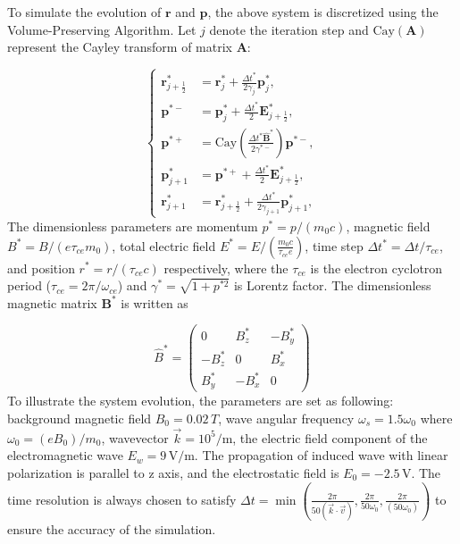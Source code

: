 \documentclass{cpbtex3}
\begin{document}
To simulate the evolution of $\bm{r}$ and $\bm{p}$, the above system is discretized using the Volume-Preserving Algorithm\cite{zhang2015volume,liu2016collisionless}. Let $j$ denote the iteration step and $\text{Cay}(\bm{A})$ represent the Cayley transform of matrix $\bm{A}$:

\begin{equation}
\left\{
\begin{aligned}
\bm{r}^*_{j+\frac{1}{2}} &= \bm{r}^*_j + \frac{\Delta t^*}{2 \gamma_j} \bm{p}^*_j, \\
\bm{p}^{*-} &= \bm{p}^*_j + \frac{\Delta t^*}{2} \bm{E}^*_{j+\frac{1}{2}}, \\
\bm{p}^{*+} &= \text{Cay} \left( \frac{\Delta t^* \hat{\bm{B}}^*}{2 \gamma^{*-}} \right) \bm{p}^{*-}, \\
\bm{p}^*_{j+1} &= \bm{p}^{*+} + \frac{\Delta t^*}{2} \bm{E}^*_{j+\frac{1}{2}}, \\
\bm{r}^*_{j+1} &= \bm{r}^*_{j+\frac{1}{2}} + \frac{\Delta t^*}{2 \gamma_{j+1}} \bm{p}^*_{j+1},
\end{aligned}
\right.
\end{equation}
The dimensionless parameters are momentum \( p^* = p/(m_0 c) \), magnetic field \( B^* = B/(e \tau_{ce} m_0) \), total electric field \( E^* = E/(\frac{m_0 c}{\tau_{ce} e}) \), time step \( \Delta t^* = \Delta t / \tau_{ce} \), and position \( r^* = r / (\tau_{ce} c) \) respectively, where the \( \tau_{ce} \) is the electron cyclotron period (\( \tau_{ce} = 2\pi / \omega_{ce} \)) and \( \gamma^* = \sqrt{1 + p^{*2}} \) is Lorentz factor. The dimensionless magnetic matrix \( \mathbf{B}^* \) \cite{zhang2015volume} is written as

\begin{equation}
\hat{B}^* =
\begin{pmatrix}
0 & B_z^* & -B_y^* \\
-B_z^* & 0 & B_x^* \\
B_y^* & -B_x^* & 0
\end{pmatrix}
\end{equation}
To illustrate the system evolution, the parameters are set as following: background magnetic field \( B_0 = 0.02\,T \), wave angular frequency \( \omega_s = 1.5 \omega_0 \) where \( \omega_0 = (e B_0)/m_0 \), wavevector \( \vec{k} = 10^5/\mathrm{m} \), the electric field component of the electromagnetic wave \( E_w = 9\,\mathrm{V/m} \). The propagation of induced wave with linear polarization is parallel to z axis, and the electrostatic field is \( E_0 = -2.5\,\mathrm{V} \). The time resolution is always chosen to satisfy 
\(
\Delta t = \min \left( \frac{2\pi}{50(\vec{k} \cdot \vec{v})}, \frac{2\pi}{50\omega_0}, \frac{2\pi}{(50\omega_0)} \right)
\)
to ensure the accuracy of the simulation.
\end{document}
